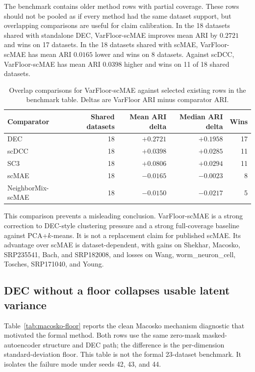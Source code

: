 \documentclass[11pt]{article}
\begin{document}
The benchmark contains older method rows with partial coverage. These rows should not be pooled as if every method had the same dataset support, but overlapping comparisons are useful for claim calibration. In the 18 datasets shared with standalone DEC, VarFloor-scMAE improves mean ARI by $0.2721$ and wins on 17 datasets. In the 18 datasets shared with scMAE, VarFloor-scMAE has mean ARI $0.0165$ lower and wins on 8 datasets. Against scDCC, VarFloor-scMAE has mean ARI $0.0398$ higher and wins on 11 of 18 shared datasets.

\begin{table}[ht]
\centering
\caption{Overlap comparisons for VarFloor-scMAE against selected existing rows in the benchmark table. Deltas are VarFloor ARI minus comparator ARI.}
\label{tab:overlap-comparisons}
\begin{tabular}{lrrrr}
\toprule
Comparator & Shared datasets & Mean ARI delta & Median ARI delta & Wins \\
\midrule
DEC & 18 & $+0.2721$ & $+0.1958$ & 17 \\
scDCC & 18 & $+0.0398$ & $+0.0285$ & 11 \\
SC3 & 18 & $+0.0806$ & $+0.0294$ & 11 \\
scMAE & 18 & $-0.0165$ & $-0.0023$ & 8 \\
NeighborMix-scMAE & 18 & $-0.0150$ & $-0.0217$ & 5 \\
\bottomrule
\end{tabular}
\end{table}

This comparison prevents a misleading conclusion. VarFloor-scMAE is a strong correction to DEC-style clustering pressure and a strong full-coverage baseline against PCA+$k$-means. It is not a replacement claim for published scMAE. Its advantage over scMAE is dataset-dependent, with gains on Shekhar, Macosko, SRP235541, Bach, and SRP182008, and losses on Wang, worm\_neuron\_cell, Tosches, SRP171040, and Young.

\subsection{DEC without a floor collapses usable latent variance}

Table~\ref{tab:macosko-floor} reports the clean Macosko mechanism diagnostic that motivated the formal method. Both rows use the same zero-mask masked-autoencoder structure and DEC path; the difference is the per-dimension standard-deviation floor. This table is not the formal 23-dataset benchmark. It isolates the failure mode under seeds 42, 43, and 44.
\end{document}

